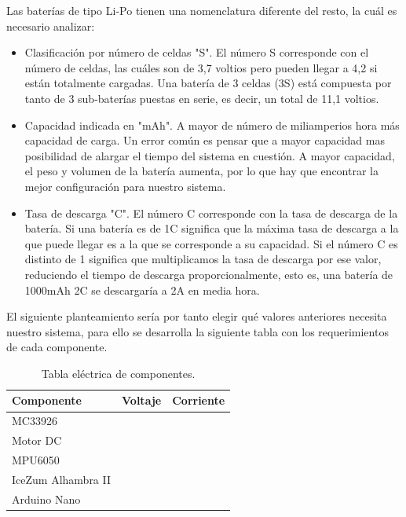 Las baterías de tipo Li-Po tienen una nomenclatura diferente del resto, la cuál es necesario analizar:

\begin{itemize}
	\item Clasificación por número de celdas "S". El número S corresponde con el número de celdas, las cuáles son de 3,7 voltios pero pueden llegar a 4,2 si están totalmente cargadas. Una batería de 3 celdas (3S) está compuesta por tanto de 3 sub-baterías puestas en serie, es decir, un total de 11,1 voltios.
	\item Capacidad indicada en "mAh". A mayor de número de miliamperios hora más capacidad de carga. Un error común es pensar que a mayor capacidad mas posibilidad de alargar el tiempo del sistema en cuestión. A mayor capacidad, el peso y volumen de la batería aumenta, por lo que hay que encontrar la mejor configuración para nuestro sistema. 
	\item Tasa de descarga "C". El número C corresponde con la tasa de descarga de la batería. Si una batería es de 1C significa que la máxima tasa de descarga a la que puede llegar es a la que se corresponde a su capacidad. Si el número C es distinto de 1 significa que multiplicamos la tasa de descarga por ese valor, reduciendo el tiempo de descarga proporcionalmente, esto es, una batería de 1000mAh 2C se descargaría a 2A en media hora.
\end{itemize}

El siguiente planteamiento sería por tanto elegir qué valores anteriores necesita nuestro sistema, para ello se desarrolla la siguiente tabla con los requerimientos de cada componente.

\renewcommand\tablename{Tabla}
\begin{table}[H]
	\centering

	\begin{tabular}{|l|l|l|}
		\hline
		Componente         & Voltaje & Corriente \\ \hline
		MC33926            &         &           \\ \hline
		Motor DC           &         &           \\ \hline
		MPU6050            &         &           \\ \hline
		IceZum Alhambra II &         &           \\ \hline
		Arduino Nano       &         &           \\ \hline
	\end{tabular}
		\caption{Tabla eléctrica de componentes.}
		\label{fig:Tabla eléctrica de componentes.}
\end{table}

